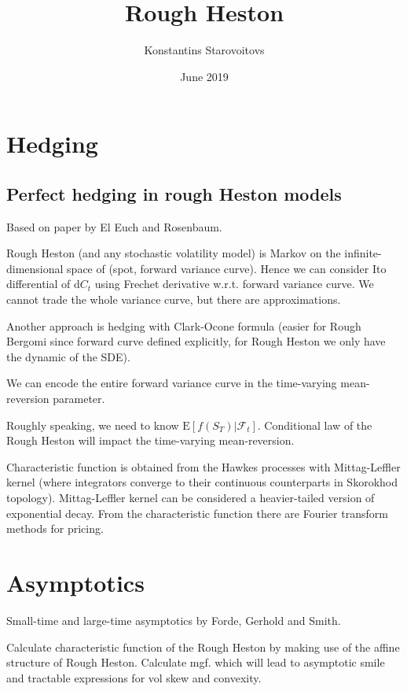 \documentclass[12pt]{article}
\title{Rough Heston}
\author{Konstantins Starovoitovs}
\date{June 2019}
\begin{document}
\maketitle

\section{Hedging}

\subsection{Perfect hedging in rough Heston models}

Based on paper by El Euch and Rosenbaum.
    
Rough Heston (and any stochastic volatility model) is Markov on the infinite-dimensional space of (spot, forward variance curve). Hence we can consider Ito differential of $\mathrm d C_t$ using Frechet derivative w.r.t. forward variance curve. We cannot trade the whole variance curve, but there are approximations.

Another approach is hedging with Clark-Ocone formula (easier for Rough Bergomi since forward curve defined explicitly, for Rough Heston we only have the dynamic of the SDE).

We can encode the entire forward variance curve in the time-varying mean-reversion parameter.

Roughly speaking, we need to know $\mathrm E [f(S_T)|\mathcal F_t]$. Conditional law of the Rough Heston will impact the time-varying mean-reversion.

Characteristic function is obtained from the Hawkes processes with Mittag-Leffler kernel (where integrators converge to their continuous counterparts in Skorokhod topology). Mittag-Leffler kernel can be considered a heavier-tailed version of exponential decay. From the characteristic function there are Fourier transform methods for pricing.

\section{Asymptotics}

Small-time and large-time asymptotics by Forde, Gerhold and Smith.

Calculate characteristic function of the Rough Heston by making use of the affine structure of Rough Heston. Calculate mgf. which will lead to asymptotic smile and tractable expressions for vol skew and convexity.
\end{document}
